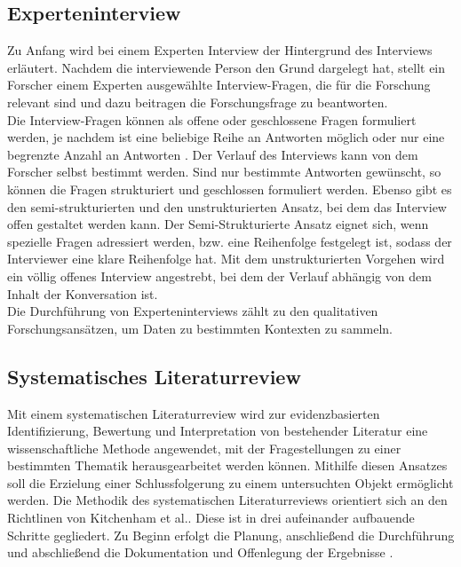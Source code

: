     \subsection{Experteninterview}
    \label{subsec:experteninterview}
        Zu Anfang wird bei einem Experten Interview der Hintergrund des Interviews erläutert. Nachdem die interviewende 
        Person den Grund dargelegt hat, stellt ein Forscher einem Experten ausgewählte Interview-Fragen, die für die 
        Forschung relevant sind und dazu beitragen die Forschungsfrage zu beantworten.
        \\
        \linebreak
        Die Interview-Fragen können als offene oder geschlossene Fragen formuliert werden, je nachdem ist eine beliebige Reihe 
        an Antworten möglich oder nur eine begrenzte Anzahl an Antworten \cite{robson2002real}. Der Verlauf des Interviews 
        kann von dem Forscher selbst bestimmt werden. Sind nur bestimmte Antworten gewünscht, so können die Fragen strukturiert und 
        geschlossen formuliert werden. Ebenso gibt es den semi-strukturierten und den unstrukturierten Ansatz, bei dem das Interview 
        offen gestaltet werden kann. Der Semi-Strukturierte Ansatz eignet sich, wenn spezielle Fragen adressiert werden, bzw. eine 
        Reihenfolge festgelegt ist, sodass der Interviewer eine klare Reihenfolge hat. Mit dem unstrukturierten Vorgehen wird 
        ein völlig offenes Interview angestrebt, bei dem der Verlauf abhängig von dem Inhalt der Konversation ist.
        \\
        Die Durchführung von Experteninterviews zählt zu den qualitativen Forschungsansätzen, um Daten zu bestimmten Kontexten zu sammeln.

    \subsection{Systematisches Literaturreview}
    \label{subsec:systematischesliteraturreview}
        Mit einem systematischen Literaturreview wird zur evidenzbasierten Identifizierung, Bewertung und Interpretation  
        von bestehender Literatur eine wissenschaftliche Methode angewendet, mit der Fragestellungen zu einer bestimmten Thematik 
        herausgearbeitet werden können. Mithilfe diesen Ansatzes soll die Erzielung einer Schlussfolgerung zu einem untersuchten Objekt 
        ermöglicht werden. 
        Die Methodik des systematischen Literaturreviews orientiert sich an den Richtlinen von Kitchenham et al.. Diese ist in drei 
        aufeinander aufbauende Schritte gegliedert. Zu Beginn erfolgt die Planung, anschließend die Durchführung und abschließend die 
        Dokumentation und Offenlegung der Ergebnisse \cite{Kitchenham2007}.

